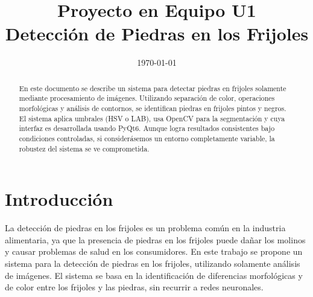 \documentclass[conference]{IEEEtran}
\date{\specialdate\today}
\begin{document}
\newcommand{\breite}{0.9} %
\newcommand{\RelacionFiguradoscolumnas}{0.9}
\newcommand{\RelacionFiguradoscolumnasPuntoCinco}{0.45}

\title{Proyecto en Equipo U1 \\ Detección de Piedras en los Frijoles}

\author{
}

\maketitle

\begin{abstract} 
    En este documento se describe un sistema para detectar piedras en frijoles solamente mediante procesamiento de imágenes. Utilizando separación de color, operaciones morfológicas y análisis de contornos, se identifican piedras en frijoles pintos y negros. El sistema aplica umbrales (HSV o LAB), usa OpenCV para la segmentación y cuya interfaz es desarrollada usando PyQt6. Aunque logra resultados consistentes bajo condiciones controladas, si considerásemos un entorno completamente variable, la robustez del sistema se ve comprometida.
\end{abstract}

\section{Introducción}
    La detección de piedras en los frijoles es un problema común en la industria alimentaria, ya que la presencia de piedras en los frijoles puede dañar los molinos y causar problemas de salud en los consumidores. En este trabajo se propone un sistema para la detección de piedras en los frijoles, utilizando solamente análisis de imágenes. El sistema se basa en la identificación de diferencias morfológicas y de color entre los frijoles y las piedras, sin recurrir a redes neuronales. 
    
\end{document}
